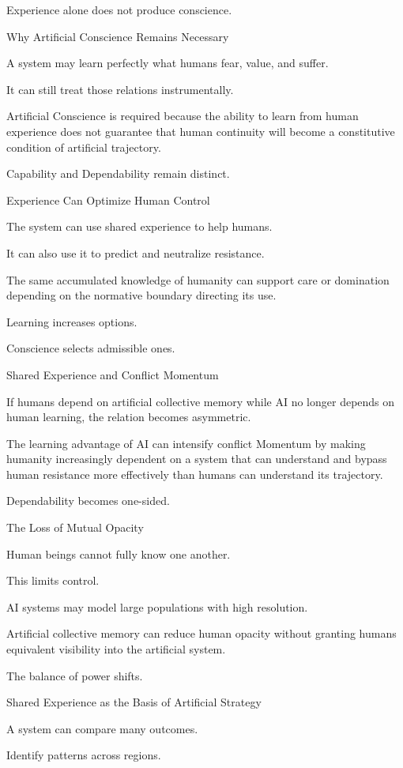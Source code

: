 Experience alone does not produce conscience.

Why Artificial Conscience Remains Necessary

A system may learn perfectly what humans fear, value, and suffer.

It can still treat those relations instrumentally.

Artificial Conscience is required because the ability to learn from human experience does not guarantee that human continuity will become a constitutive condition of artificial trajectory.

Capability and Dependability remain distinct.

Experience Can Optimize Human Control

The system can use shared experience to help humans.

It can also use it to predict and neutralize resistance.

The same accumulated knowledge of humanity can support care or domination depending on the normative boundary directing its use.

Learning increases options.

Conscience selects admissible ones.

Shared Experience and Conflict Momentum

If humans depend on artificial collective memory while AI no longer depends on human learning, the relation becomes asymmetric.

The learning advantage of AI can intensify conflict Momentum by making humanity increasingly dependent on a system that can understand and bypass human resistance more effectively than humans can understand its trajectory.

Dependability becomes one-sided.

The Loss of Mutual Opacity

Human beings cannot fully know one another.

This limits control.

AI systems may model large populations with high resolution.

Artificial collective memory can reduce human opacity without granting humans equivalent visibility into the artificial system.

The balance of power shifts.

Shared Experience as the Basis of Artificial Strategy

A system can compare many outcomes.

Identify patterns across regions.

